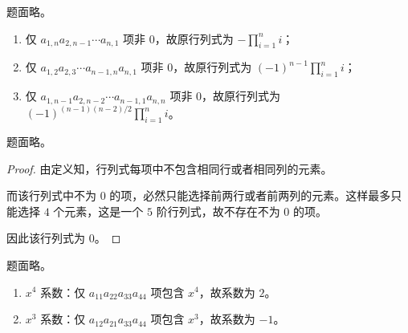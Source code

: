 \begin{problem}[课后习题 9]
	题面略。

	\begin{solution}
		\begin{enumerate}
			\item 仅 $a_{1,n} a_{2,n-1} \cdots a_{n,1}$ 项非 $0$，故原行列式为 $-\prod_{i=1}^n i$；
			\item 仅 $a_{1,2} a_{2,3} \cdots a_{n-1,n} a_{n,1}$ 项非 $0$，故原行列式为 $(-1)^{n-1} \prod_{i=1}^n i$；
			\item 仅 $a_{1,n-1} a_{2,n-2} \cdots a_{n-1,1} a_{n,n}$ 项非 $0$，故原行列式为 $(-1)^{(n-1)(n-2)/2} \prod_{i=1}^n i$。
		\end{enumerate}
	\end{solution}	
\end{problem}

\begin{problem}[课后习题 10]
	题面略。

	\begin{proof}
		由定义知，行列式每项中不包含相同行或者相同列的元素。

		而该行列式中不为 $0$ 的项，必然只能选择前两行或者前两列的元素。这样最多只能选择 $4$ 个元素，这是一个 $5$ 阶行列式，故不存在不为 $0$ 的项。

		因此该行列式为 $0$。
	\end{proof}
\end{problem}

\begin{problem}[课后习题 11]
	题面略。

	\begin{solution}
		\begin{enumerate}
			\item $x^4$ 系数：仅 $a_{11} a_{22} a_{33} a_{44}$ 项包含 $x^4$，故系数为 $2$。
			\item $x^3$ 系数：仅 $a_{12} a_{21} a_{33} a_{44}$ 项包含 $x^3$，故系数为 $-1$。
		\end{enumerate}
	\end{solution}
\end{problem}